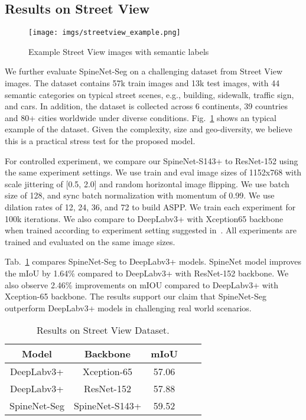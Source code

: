 \documentclass[10pt,twocolumn,letterpaper]{article}
\begin{document}
\subsection{Results on Street View}
\begin{figure}[h!]
    \centering
    \texttt{[image: imgs/streetview\_example.png]}
    \caption{Example Street View images with semantic labels}
    \label{fig:streetview_example}
\end{figure}


We further evaluate SpineNet-Seg on a challenging dataset from Street View images. The dataset contains 57k train images and 13k test images, with 44 semantic categories on typical street scenes, e.g., building, sidewalk, traffic sign, and cars. In addition, the dataset is collected across 6 continents, 39 countries and 80+ cities worldwide under diverse conditions. Fig.~\ref{fig:streetview_example} shows an typical example of the dataset. Given the complexity, size and geo-diversity, we believe this is a practical stress test for the proposed model.

For controlled experiment, we compare our SpineNet-S143+ to ResNet-152 using the same experiment settings. We use train and eval image sizes of 1152x768 with scale jittering of [0.5, 2.0] and random horizontal image flipping. We use batch size of 128, and sync batch normalization with momentum of 0.99. We use dilation rates of 12, 24, 36, and 72 to build ASPP. We train each experiment for 100k iterations. We also compare to DeepLabv3+ with Xception65 backbone when trained according to experiment setting suggested in~\cite{deeplabv3plus}. All experiments are trained and evaluated on the same image sizes.

Tab.~\ref{tab:results_sv} compares SpineNet-Seg to DeepLabv3+ models. SpineNet model improves the mIoU by 1.64\% compared to DeepLabv3+ with ResNet-152 backbone. We also observe 2.46\% improvements on mIOU compared to DeepLabv3+ with Xception-65 backbone. The results support our claim that SpineNet-Seg outperform DeepLabv3+ models in challenging real world scenarios.

\setlength{\tabcolsep}{4pt}
\begin{table}[h!]
\centering
\begin{tabular}{c| c | c  c | c}
  \toprule
  Model & Backbone & mIoU  \\
  \midrule
  DeepLabv3+ & Xception-65 & 57.06 \\
  DeepLabv3+ & ResNet-152 & 57.88 \\
  SpineNet-Seg & SpineNet-S143+ & 59.52 \\
  \bottomrule
\end{tabular}
\caption{Results on Street View Dataset.}
\label{tab:results_sv} 
\end{table}
\end{document}
